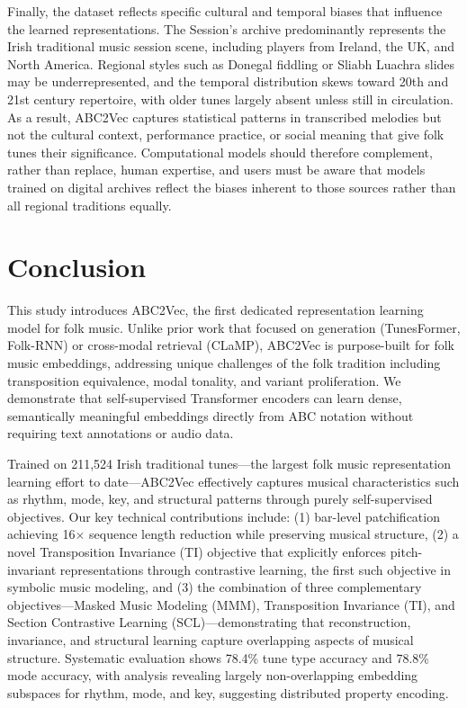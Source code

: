 \documentclass[]{interact}
\theoremstyle{plain}
\theoremstyle{definition}
\theoremstyle{remark}
\begin{document}
Finally, the dataset reflects specific cultural and temporal biases that influence the learned representations. The Session's archive predominantly represents the Irish traditional music session scene, including players from Ireland, the UK, and North America. Regional styles such as Donegal fiddling or Sliabh Luachra slides may be underrepresented, and the temporal distribution skews toward 20th and 21st century repertoire, with older tunes largely absent unless still in circulation. As a result, ABC2Vec captures statistical patterns in transcribed melodies but not the cultural context, performance practice, or social meaning that give folk tunes their significance. Computational models should therefore complement, rather than replace, human expertise, and users must be aware that models trained on digital archives reflect the biases inherent to those sources rather than all regional traditions equally.


\section{Conclusion}\label{sec:conclusion}

This study introduces ABC2Vec, the first dedicated representation learning model for folk music. Unlike prior work that focused on generation (TunesFormer, Folk-RNN) or cross-modal retrieval (CLaMP), ABC2Vec is purpose-built for folk music embeddings, addressing unique challenges of the folk tradition including transposition equivalence, modal tonality, and variant proliferation. We demonstrate that self-supervised Transformer encoders can learn dense, semantically meaningful embeddings directly from ABC notation without requiring text annotations or audio data.

Trained on 211,524 Irish traditional tunes—the largest folk music representation learning effort to date—ABC2Vec effectively captures musical characteristics such as rhythm, mode, key, and structural patterns through purely self-supervised objectives. Our key technical contributions include: (1) bar-level patchification achieving 16$\times$ sequence length reduction while preserving musical structure, (2) a novel Transposition Invariance (TI) objective that explicitly enforces pitch-invariant representations through contrastive learning, the first such objective in symbolic music modeling, and (3) the combination of three complementary objectives—Masked Music Modeling (MMM), Transposition Invariance (TI), and Section Contrastive Learning (SCL)—demonstrating that reconstruction, invariance, and structural learning capture overlapping aspects of musical structure. Systematic evaluation shows 78.4\% tune type accuracy and 78.8\% mode accuracy, with analysis revealing largely non-overlapping embedding subspaces for rhythm, mode, and key, suggesting distributed property encoding.
\end{document}
